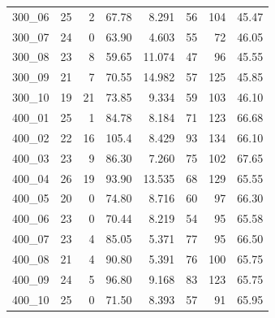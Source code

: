 \begin{tabular*}{\textwidth}{@{\extracolsep{\fill}} ccrrrrrr}
 	300\_06      &             25    &              2  &  67.78    & 8.291 & 56    & 104   & 45.47     \\
 	300\_07      &             24    &              0  &  63.90    & 4.603 & 55    & 72    & 46.05     \\
 	300\_08      &             23    &              8  &  59.65    & 11.074& 47    & 96    & 45.55     \\
 	300\_09      &             21    &              7  &  70.55    & 14.982& 57    & 125   & 45.85     \\
 	300\_10      &             19    &             21  &  73.85    & 9.334 & 59    & 103   & 46.10     \\ \hline
 	400\_01      &             25    &              1  &  84.78    & 8.184 & 71    & 123   & 66.68     \\
 	400\_02      &             22    &             16  &  105.4    & 8.429 & 93    & 134   & 66.10     \\
 	400\_03      &             23    &              9  &  86.30    & 7.260 & 75    & 102   & 67.65     \\
 	400\_04      &             26    &             19  &  93.90    & 13.535& 68    & 129   & 65.55     \\
 	400\_05      &             20    &              0  &  74.80    & 8.716 & 60    & 97    & 66.30     \\
 	400\_06      &             23    &              0  &  70.44    & 8.219 & 54    & 95    & 65.58     \\
 	400\_07      &             23    &              4  &  85.05    & 5.371 & 77    & 95    & 66.50     \\
 	400\_08      &             21    &              4  &  90.80    & 5.391 & 76    & 100   & 65.75     \\
 	400\_09      &             24    &              5  &  96.80    & 9.168 & 83    & 123   & 65.75     \\
 	400\_10      &             25    &              0  &  71.50    & 8.393 & 57    & 91    & 65.95     \\ \hline
 \end{tabular*}
\newpage
